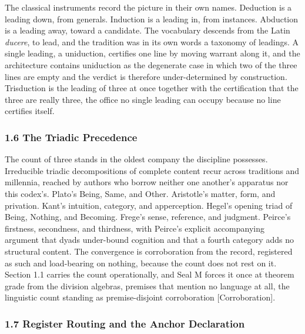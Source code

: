 \documentclass[10pt,twocolumn]{article}
\begin{document}
The classical instruments record the picture in their own names.
Deduction is a leading down, from generals. Induction is a leading in,
from instances. Abduction is a leading away, toward a candidate. The
vocabulary descends from the Latin \emph{ducere}, to lead, and the
tradition was in its own words a taxonomy of leadings. A single leading,
a uniduction, certifies one line by moving warrant along it, and the
architecture contains uniduction as the degenerate case in which two of
the three lines are empty and the verdict is therefore under-determined
by construction. Trisduction is the leading of three at once together
with the certification that the three are really three, the office no
single leading can occupy because no line certifies itself.

\hypertarget{the-triadic-precedence}{%
\subsubsection{1.6 The Triadic
Precedence}\label{the-triadic-precedence}}

The count of three stands in the oldest company the discipline
possesses. Irreducible triadic decompositions of complete content recur
across traditions and millennia, reached by authors who borrow neither
one another's apparatus nor this codex's. Plato's Being, Same, and
Other. Aristotle's matter, form, and privation. Kant's intuition,
category, and apperception. Hegel's opening triad of Being, Nothing, and
Becoming. Frege's sense, reference, and judgment. Peirce's firstness,
secondness, and thirdness, with Peirce's explicit accompanying argument
that dyads under-bound cognition and that a fourth category adds no
structural content. The convergence is corroboration from the record,
registered as such and load-bearing on nothing, because the count does
not rest on it. Section 1.1 carries the count operationally, and Seal M
forces it once at theorem grade from the division algebras, premises
that mention no language at all, the linguistic count standing as
premise-disjoint corroboration {[}Corroboration{]}.

\hypertarget{register-routing-and-the-anchor-declaration}{%
\subsubsection{1.7 Register Routing and the Anchor
Declaration}\label{register-routing-and-the-anchor-declaration}}
\end{document}
